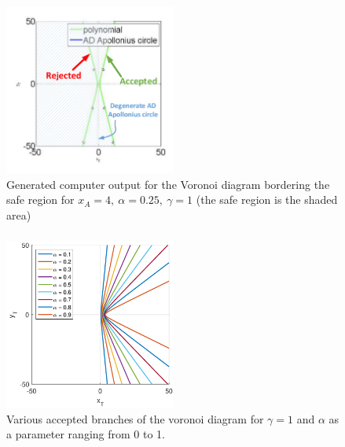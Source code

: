 \documentclass{beamer}
\begin{document}
\begin{frame}
\frametitle{}
\begin{figure}[htb]
\centering
\includegraphics[width=0.5\textwidth]{fig/g_1.pdf}
\caption{Generated computer output for the Voronoi diagram bordering the safe region for $x_A=4,\ \alpha=0.25,\ \gamma=1$ (the safe region is the shaded area)}
\label{gamma=1}
\end{figure}
\end{frame}

\begin{frame}
\frametitle{}
\begin{figure}[htb]
\centering
\includegraphics[width=0.5\textwidth]{fig/VAR_alpha_g_1.pdf}
\caption{Various accepted branches of the voronoi diagram for $\gamma=1$ and $\alpha$ as a parameter ranging from 0 to 1.}
\label{VAR_alpha_gamma=1}
\end{figure}
\end{frame}
\end{document}
